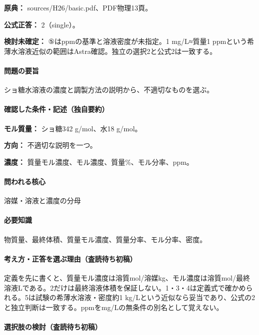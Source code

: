 \noindent\textbf{原典：} sources/H26/basic.pdf、PDF物理13頁。

\textbf{公式正答：} 2（single）。

\par\textbf{検討未確定：} ⑤はppmの基準と溶液密度が未指定。1 mg/L≈質量1 ppmという希薄水溶液近似の範囲はAstra確認。独立の選択2と公式2は一致する。

\paragraph{問題の要旨} ショ糖水溶液の濃度と調製方法の説明から、不適切なものを選ぶ。

\paragraph{確認した条件・記述（独自要約）}\mbox{}\par

\noindent\textbf{モル質量：} ショ糖342 g/mol、水18 g/mol。\par

\noindent\textbf{方向：} 不適切な説明を一つ。\par

\noindent\textbf{濃度：} 質量モル濃度、モル濃度、質量\%、モル分率、ppm。\par

\paragraph{問われる核心} 溶媒・溶液と濃度の分母

\paragraph{必要知識} 物質量、最終体積、質量モル濃度、質量分率、モル分率、密度。

\paragraph{考え方・正答を選ぶ理由（査読待ち初稿）} 定義を先に書くと、質量モル濃度は溶質mol/溶媒kg、モル濃度は溶質mol/最終溶液Lである。2だけは最終溶液体積を保証しない。1・3・4は定義式で確かめられる。5は試験の希薄水溶液・密度約1 kg/Lという近似なら妥当であり、公式の2と独立判断は一致する。ppmをmg/Lの無条件の別名として覚えない。

\paragraph{選択肢の検討（査読待ち初稿）}\mbox{}\par

